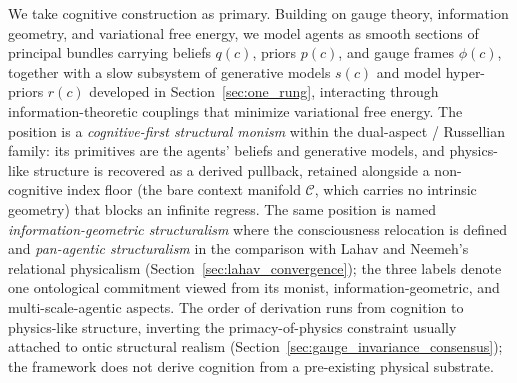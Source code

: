 \documentclass[11pt]{article}
\begin{document}
\label{sec:cognitive_first}We take cognitive construction as primary. Building on gauge theory, information geometry, and variational free energy, we model agents as smooth sections of principal bundles carrying beliefs $q(c)$, priors $p(c)$, and gauge frames $\phi(c)$, together with a slow subsystem of generative models $s(c)$ and model hyper-priors $r(c)$ developed in Section~\ref{sec:one_rung}, interacting through information-theoretic couplings that minimize variational free energy. The position is a \emph{cognitive-first structural monism} within the dual-aspect / Russellian family: its primitives are the agents' beliefs and generative models, and physics-like structure is recovered as a derived pullback, retained alongside a non-cognitive index floor (the bare context manifold $\mathcal{C}$, which carries no intrinsic geometry) that blocks an infinite regress. The same position is named \emph{information-geometric structuralism} where the consciousness relocation is defined and \emph{pan-agentic structuralism} in the comparison with Lahav and Neemeh's relational physicalism (Section~\ref{sec:lahav_convergence}); the three labels denote one ontological commitment viewed from its monist, information-geometric, and multi-scale-agentic aspects. The order of derivation runs from cognition to physics-like structure, inverting the primacy-of-physics constraint usually attached to ontic structural realism (Section~\ref{sec:gauge_invariance_consensus}); the framework does not derive cognition from a pre-existing physical substrate.
\end{document}
